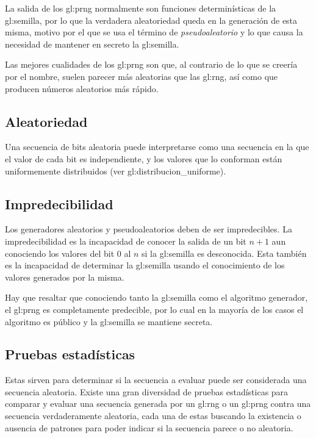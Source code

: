 La salida de los \gls{gl:prng} normalmente son funciones determinísticas de
la \gls{gl:semilla}, por lo que la verdadera aleatoriedad queda en la
generación de esta misma, motivo por el que se usa el término de
\textit{pseudoaleatorio} y lo que causa la necesidad de mantener en secreto
la \gls{gl:semilla}.

Las mejores cualidades de los \gls{gl:prng} son que, al contrario de lo que
se creería por el nombre, suelen parecer más aleatorias que las \gls{gl:rng},
así como que producen números aleatorios más rápido.

\subsection{Aleatoriedad} %

Una secuencia de bits aleatoria puede interpretarse como una secuencia en la
que el valor de cada bit es independiente, y los valores que lo conforman
están uniformemente distribuidos (ver \gls{gl:distribucion_uniforme}).

\subsection{Impredecibilidad} %
\label{sec:impredecibilidad}

Los generadores aleatorios y pseudoaleatorios deben de ser impredecibles.
La impredecibilidad es la incapacidad de conocer la salida de un bit $n+1$
aun conociendo los valores del bit $0$ al $n$ si la \gls{gl:semilla} es
desconocida. Esta también es la incapacidad de determinar la \gls{gl:semilla}
usando el conocimiento de los valores generados por la misma.

Hay que resaltar que conociendo tanto la \gls{gl:semilla} como el algoritmo
generador, el \gls{gl:prng} es completamente predecible, por lo cual en la
mayoría de los casos el algoritmo es público y la \gls{gl:semilla} se mantiene
secreta.

\subsection{Pruebas estadísticas} %

Estas sirven para determinar si la secuencia a evaluar puede ser considerada
una secuencia aleatoria. Existe una gran diversidad de pruebas estadísticas
para comparar y evaluar una secuencia generada por un \gls{gl:rng} o un
\gls{gl:prng} contra una secuencia verdaderamente aleatoria, cada una de
estas buscando la existencia o ausencia de patrones para poder indicar
si la secuencia parece o no aleatoria.

